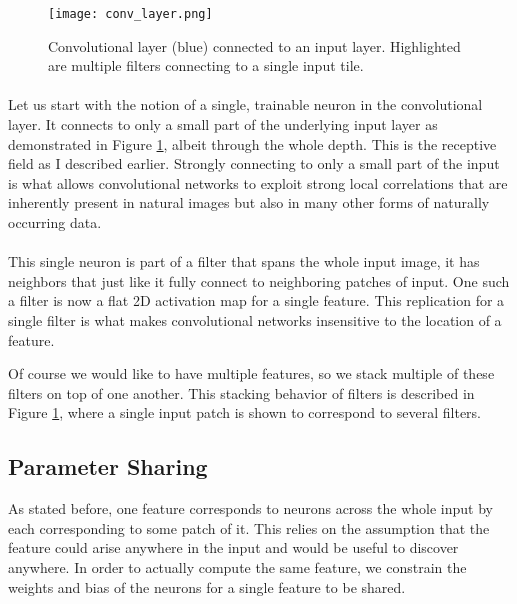 \begin{figure}[htpb]
  \centering
  \texttt{[image: conv\_layer.png]}
  \caption[Convolutional layer]{Convolutional layer (blue) connected to an input layer.
    Highlighted are multiple filters connecting to a single input tile.
  }
  \label{fig:conv_layer}
\end{figure}

\paragraph{}
Let us start with the notion of a single, trainable neuron
in the convolutional layer.
It connects to only a small part of
the underlying input layer
as demonstrated in
Figure \ref{fig:conv_layer},
albeit through the whole depth.
This is the receptive field
as I described earlier.
Strongly connecting to only a small part of the input
is what allows convolutional networks
to exploit strong local correlations
that are inherently present
in natural images
but also in many other forms of
naturally occurring data.

\paragraph{}
This single neuron is part of a filter
that spans the whole input image,
it has neighbors that just like it
fully connect to neighboring patches of input.
One such a filter is now a flat 2D activation map
for a single feature.
This replication for a single filter
is what makes convolutional networks
insensitive to the location of a feature.

Of course we would like to have multiple features,
so we stack multiple of these filters on top of one another.
This stacking behavior of filters is described in
Figure \ref{fig:conv_layer},
where a single input patch is shown to correspond
to several filters.

\subsection{Parameter Sharing}
\label{sub:parameter_sharing}
As stated before, one feature corresponds to neurons across
the whole input by each corresponding to some patch of it.
This relies on the assumption that the feature could arise
anywhere in the input and would be useful to discover anywhere.
In order to actually compute the same feature,
we constrain the weights and bias of the neurons for a single feature
to be shared.

